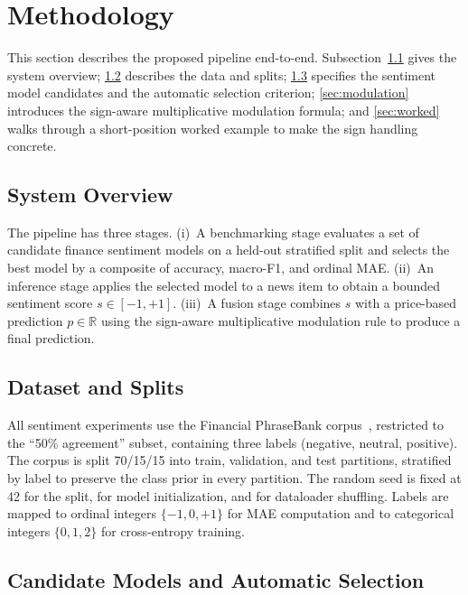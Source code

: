 \documentclass[conference]{IEEEtran}
\begin{document}
\section{Methodology}

This section describes the proposed pipeline end-to-end.
Subsection~\ref{sec:overview} gives the system overview;
\ref{sec:data} describes the data and splits;
\ref{sec:selection} specifies the sentiment model candidates and the
automatic selection criterion;
\ref{sec:modulation} introduces the sign-aware multiplicative modulation
formula; and \ref{sec:worked} walks through a short-position worked example
to make the sign handling concrete.

\subsection{System Overview}
\label{sec:overview}

The pipeline has three stages. (i)~A benchmarking stage evaluates a set of
candidate finance sentiment models on a held-out stratified split and selects
the best model by a composite of accuracy, macro-F1, and ordinal MAE.
(ii)~An inference stage applies the selected model to a news item to obtain a
bounded sentiment score $s \in [-1, +1]$. (iii)~A fusion stage combines $s$
with a price-based prediction $p \in \mathbb{R}$ using the sign-aware
multiplicative modulation rule to produce a final prediction.

\subsection{Dataset and Splits}
\label{sec:data}

All sentiment experiments use the Financial PhraseBank corpus~\cite{malo2014},
restricted to the ``50\% agreement'' subset, containing three labels
(negative, neutral, positive). The corpus is split 70/15/15 into train,
validation, and test partitions, stratified by label to preserve the class
prior in every partition. The random seed is fixed at 42 for the split, for
model initialization, and for dataloader shuffling. Labels are mapped to
ordinal integers $\{-1, 0, +1\}$ for MAE computation and to categorical
integers $\{0, 1, 2\}$ for cross-entropy training.

\subsection{Candidate Models and Automatic Selection}
\label{sec:selection}
\end{document}
